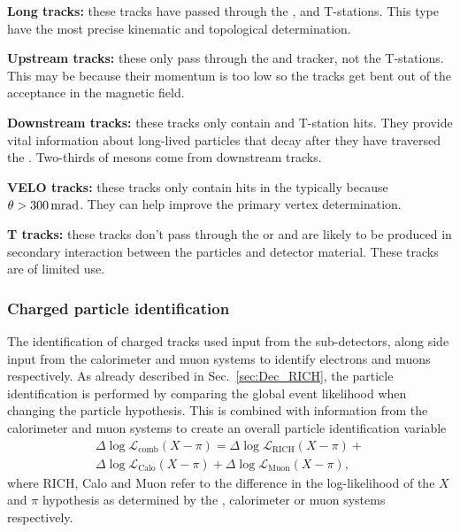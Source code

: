 \begin{description}
\item \textbf{Long tracks:} these tracks have passed through the \velo, \ttracker and T-stations. This type have the most precise kinematic and topological determination.
\item \textbf{Upstream tracks:} these only pass through the \velo and \ttracker tracker, not the T-stations. This may be because their momentum is too low so the tracks get bent out of the acceptance in the magnetic field.
\item \textbf{Downstream tracks:} these tracks only contain \ttracker and T-station hits. They provide vital information about long-lived particles that decay after they have traversed the \velo.  Two-thirds of \KS mesons come from downstream tracks. 
\item \textbf{VELO tracks:} these tracks only contain hits in the \velo typically because $\theta > 300\mathrm{ \,mrad}$. They can help improve the primary vertex determination. 
\item \textbf{T tracks:} these tracks don't pass through the \velo or \ttracker and are likely to be produced in secondary interaction between the particles and detector material. These tracks are of limited use.
\end{description}

\subsubsection{Charged particle identification}

The identification of charged tracks used input from the \rich sub-detectors, along side input from the calorimeter and muon systems to identify electrons and muons respectively. 
As already described in Sec.~\ref{sec:Dec_RICH}, the \rich particle identification is performed by comparing the global event likelihood when changing the particle hypothesis. 
This is combined with information from the calorimeter and muon systems to create an overall particle identification variable
\begin{multline}
\Delta \log{\mathcal{L}_\text{comb}}(X-\pi) =  \Delta \log{\mathcal{L}_\text{RICH}}(X-\pi) + \\
 \Delta \log{\mathcal{L}_\text{Calo}}(X-\pi) + \Delta \log{\mathcal{L}_\text{Muon}}(X-\pi),
\end{multline}
where RICH, Calo and Muon refer to the difference in the log-likelihood of the $X$ and $\pi$ hypothesis as determined by the \rich, calorimeter or muon systems respectively. 

